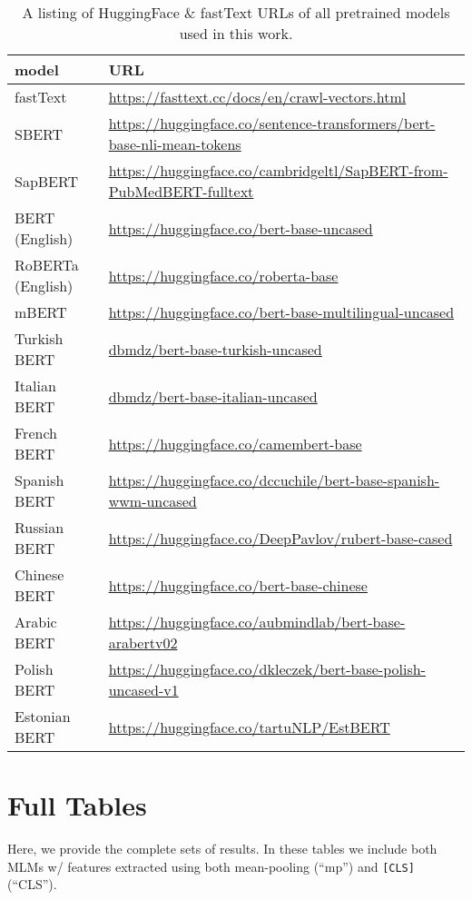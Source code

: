 \documentclass[11pt]{article}
\begin{document}
\begin{table*}[h] \small
\setlength{\tabcolsep}{1pt}
\centering
\begin{tabular}{ll}
\toprule
model & URL \\
\midrule
fastText & \url{https://fasttext.cc/docs/en/crawl-vectors.html} \\
SBERT & \url{https://huggingface.co/sentence-transformers/bert-base-nli-mean-tokens} \\
SapBERT & \url{https://huggingface.co/cambridgeltl/SapBERT-from-PubMedBERT-fulltext} \\
BERT (English) & \url{https://huggingface.co/bert-base-uncased} \\
RoBERTa (English) & \url{https://huggingface.co/roberta-base} \\
mBERT & \url{https://huggingface.co/bert-base-multilingual-uncased} \\
Turkish BERT & \url{dbmdz/bert-base-turkish-uncased} \\
Italian BERT & \url{dbmdz/bert-base-italian-uncased} \\
French BERT & \url{https://huggingface.co/camembert-base} \\
Spanish BERT  & \url{https://huggingface.co/dccuchile/bert-base-spanish-wwm-uncased} \\
Russian BERT  &  \url{https://huggingface.co/DeepPavlov/rubert-base-cased} \\
Chinese BERT  &  \url{https://huggingface.co/bert-base-chinese} \\
Arabic BERT  &  \url{https://huggingface.co/aubmindlab/bert-base-arabertv02} \\
Polish BERT  &  \url{https://huggingface.co/dkleczek/bert-base-polish-uncased-v1} \\
Estonian BERT  &  \url{https://huggingface.co/tartuNLP/EstBERT} \\

\bottomrule
\end{tabular}
\caption{A listing of HuggingFace \& fastText URLs of all pretrained models used in this work.}
\label{tab:model_url}
\end{table*}


\section{Full Tables}

Here, we provide the complete sets of results. In these tables we include both MLMs w/ features extracted using both mean-pooling (``mp'') and \texttt{[CLS]} (``CLS'').
\end{document}
